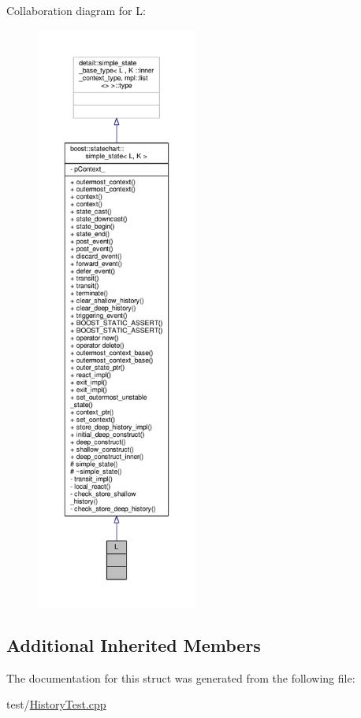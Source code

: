 Collaboration diagram for L\+:
\nopagebreak
\begin{figure}[H]
\begin{center}
\leavevmode
\includegraphics[height=550pt]{struct_l__coll__graph}
\end{center}
\end{figure}
\subsection*{Additional Inherited Members}


The documentation for this struct was generated from the following file\+:\begin{DoxyCompactItemize}
\item 
test/\mbox{\hyperlink{_history_test_8cpp}{History\+Test.\+cpp}}\end{DoxyCompactItemize}
